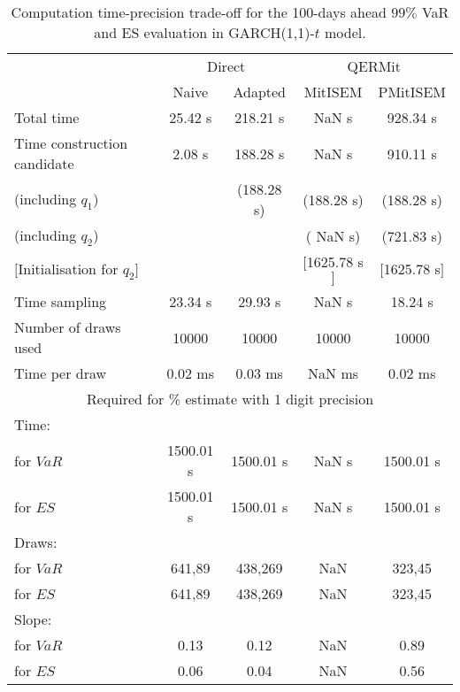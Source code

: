 { \renewcommand{\arraystretch}{1.3} 
\begin{table}[h] 
\centering 
\caption{Computation time-precision trade-off for the 100-days ahead  $99\%$ VaR and ES evaluation in GARCH(1,1)-$t$ model.} 
\label{tab:time_precision_t_garch2_noS} 
\begin{tabular}{lcccc}  
  & \multicolumn{2}{c}{Direct} & \multicolumn{2}{c}{QERMit}  \\ \cline{2-5} 
  & Naive & Adapted & MitISEM & PMitISEM  \\ \hline 
Total time & 25.42 s & 218.21 s &  NaN s & 928.34 s \\ 
Time construction candidate & 2.08 s & 188.28 s &  NaN s & 910.11 s \\ 
 (including $q_{1}$) &   &  (188.28 s) & (188.28 s) & (188.28 s) \\ 
 (including $q_{2}$) &   &  & ( NaN s) & (721.83 s) \\ 
$[$Initialisation for $q_{2}$$]$&   &   & $[$1625.78 s$]$ & $[$1625.78 s$]$ \\ 
Time sampling & 23.34 s & 29.93 s &  NaN s & 18.24 s  \\  
Number of draws used & 10000 & 10000 & 10000 & 10000 \\ 
Time per draw & 0.02 ms & 0.03 ms &  NaN ms & 0.02 ms \\ \hline 
\multicolumn{5}{c}{Required for \% estimate with 1 digit precision} \\ \hline 
Time: &  &  &   &  \\ 
\hspace{1cm} for $VaR$ & 1500.01 s & 1500.01 s &  NaN s & 1500.01 s \\ 
\hspace{1cm} for $ES$ & 1500.01 s & 1500.01 s &  NaN s & 1500.01 s \\ 
Draws: &  &  &   &  \\ 
\hspace{1cm} for $VaR$ & 641,89 & 438,269  & NaN  & 323,45  \\ 
\hspace{1cm} for $ES$ & 641,89 & 438,269  & NaN   & 323,45  \\ 
\hline 
Slope: &  &  &   &  \\ 
\hspace{1cm} for $VaR$ & 0.13 & 0.12  &  NaN  & 0.89  \\ 
\hspace{1cm} for $ES$ & 0.06 & 0.04  &  NaN   & 0.56  \\  \hline 
\end{tabular} 
\end{table} 
} 
